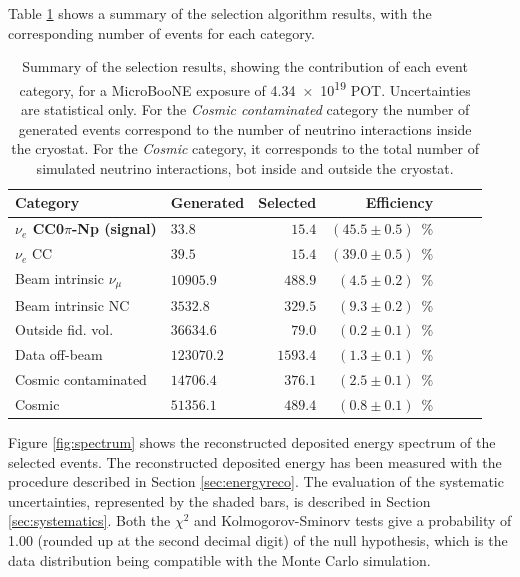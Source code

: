 Table \ref{tab:result} shows a summary of the selection algorithm results, with the corresponding number of events for each category.

\begin{table}[htbp]
   \centering
      \caption{Summary of the selection results, showing the contribution of each event category, for a MicroBooNE exposure of \num{4.34e19} POT. Uncertainties are statistical only. {For the \emph{Cosmic contaminated} category the number of generated events correspond to the number of neutrino interactions inside the cryostat. For the \emph{Cosmic} category, it corresponds to the total number of simulated neutrino interactions, bot inside and outside the cryostat.}}\label{tab:result}
   \begin{tabular}{llrrrrr}
     \toprule
     Category & Generated & Selected & Efficiency \\
     \midrule

     \textbf{$\nu_{e}$ CC0$\pi$-Np (signal)}  & $33.8$    & $15.4$  & $(45.5\pm0.5)$~\%\\
     $\nu_{e}$ CC                             & $39.5$    & $15.4$  & $(39.0\pm0.5)$~\%\\
     Beam intrinsic $\nu_{\mu}$               & $10905.9$ & $488.9$ & $(4.5\pm0.2)$~\%\\
     Beam intrinsic NC                        & $3532.8$  & $329.5$ & $(9.3\pm0.2)$~\%\\
     Outside fid. vol.                        & $36634.6$ & $79.0$  & $(0.2\pm0.1)$~\%\\
     Data off-beam                            & $123070.2$ & $1593.4$ & $(1.3\pm0.1)$~\%\\
     Cosmic contaminated                      & $14706.4$  & $376.1$  & $(2.5\pm0.1)$~\%\\ 
     Cosmic                                   & $51356.1$  & $489.4$  & $(0.8\pm0.1)$~\%\\

     \bottomrule
   \end{tabular}

\end{table}

Figure \ref{fig:spectrum} shows the reconstructed deposited energy spectrum of the selected events. The reconstructed deposited energy has been measured with the procedure described in Section \ref{sec:energyreco}. The evaluation of the systematic uncertainties, represented by the shaded bars, is described in Section \ref{sec:systematics}. Both the $\chi^2$ and Kolmogorov-Sminorv tests give a probability of 1.00 (rounded up at the second decimal digit) of the null hypothesis, which is the data distribution being compatible with the Monte Carlo simulation.

